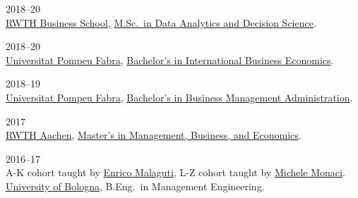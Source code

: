 \begin{paracol}{2}
  \textsc{2018--20}
\switchcolumn
  \\
  \href{https://www.business-school.rwth-aachen.de/en/}{RWTH Business School}, \href{https://www.business-school.rwth-aachen.de/en/programs/degree-programs/mme-dds/overview}{M.Sc.\ in Data Analytics and Decision Science}.
\end{paracol}

\begin{paracol}{2}
  \textsc{2018--20}
\switchcolumn
  \\
  \href{https://www.upf.edu/}{Universitat Pompeu Fabra}, \href{https://www.upf.edu/es/web/graus/grau-international-business-economics}{Bachelor's in International Business Economics}.
\end{paracol}

\begin{paracol}{2}
  \textsc{2018--19}
\switchcolumn
  \\
  \href{https://www.upf.edu/}{Universitat Pompeu Fabra}, \href{https://www.upf.edu/es/web/graus/grau-ade}{Bachelor's in Business Management Administration}.
\end{paracol}

\begin{paracol}{2}
  \textsc{2017}
\switchcolumn
  \\
  \href{http://www.rwth-aachen.de/}{RWTH Aachen}, \href{http://www.wiwi.rwth-aachen.de/cms/Wirtschaftswissenschaften/Studium/Studiengaenge/Masterstudiengaenge/~camq/Wirtschaftswissenschaft-M-Sc-/?lidx=1}{Master's in Management, Business, and Economics}.
\end{paracol}

\begin{paracol}{2}
  \textsc{2016--17}
\switchcolumn
  \\
  A-K cohort taught by \href{https://scholar.google.com/citations?user=3nD4vYkAAAAJ}{Enrico Malaguti}, L-Z cohort taught by \href{https://scholar.google.com/citations?user=wORMYBMAAAAJ}{Michele Monaci}.\\
  \href{https://www.unibo.it}{University of Bologna}, B.Eng.\ in Management Engineering.
\end{paracol}

